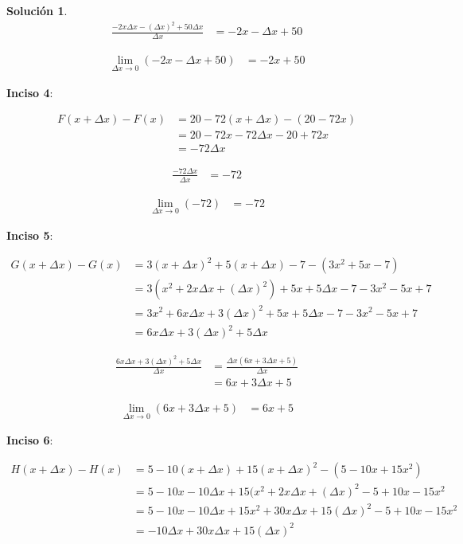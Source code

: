 \documentclass{article}
\theoremstyle{definition}
\newtheorem*{solution}{Solución}
\begin{document}
\begin{solution}
    \begin{align*}
        \frac{-2x\Delta x-(\Delta x)^2+50\Delta x}{\Delta x} &= -2x-\Delta x+50
    \end{align*}

    \begin{align*}
        \lim_{\Delta x \to 0} (-2x-\Delta x+50) &= -2x+50
    \end{align*}

\textbf{Inciso 4}:

    \begin{align*}
        F(x+\Delta x) - F(x) &= 20-72(x+\Delta x)-(20-72x) \\
        &= 20-72x-72\Delta x-20+72x \\
        &= -72\Delta x
    \end{align*}

    \begin{align*}
        \frac{-72\Delta x}{\Delta x} &= -72
    \end{align*}

    \begin{align*}
        \lim_{\Delta x \to 0} (-72) &= -72
    \end{align*}

\textbf{Inciso 5}:

    \begin{align*}
        G(x+\Delta x) - G(x) &= 3(x+\Delta x)^2+5(x+\Delta x)-7-(3x^2+5x-7) \\
        &= 3(x^2+2x\Delta x+(\Delta x)^2)+5x+5\Delta x-7-3x^2-5x+7 \\
        &= 3x^2+6x\Delta x+3(\Delta x)^2+5x+5\Delta x-7-3x^2-5x+7 \\
        &= 6x\Delta x+3(\Delta x)^2+5\Delta x
    \end{align*}

    \begin{align*}
        \frac{6x\Delta x+3(\Delta x)^2+5\Delta x}{\Delta x} &= \frac{\Delta x(6x+3\Delta x+5)}{\Delta x} \\
        &= 6x+3\Delta x+5
    \end{align*}

    \begin{align*}
        \lim_{\Delta x \to 0} (6x+3\Delta x+5) &= 6x+5
    \end{align*}

\textbf{Inciso 6}:

    \begin{align*}
        H(x+\Delta x) - H(x) &= 5-10(x+\Delta x)+15(x+\Delta x)^2-(5-10x+15x^2) \\
        &= 5-10x-10\Delta x+15(x^2+2x\Delta x+(\Delta x)^2-5+10x-15x^2 \\
        &= 5-10x-10\Delta x+15x^2+30x\Delta x+15(\Delta x)^2-5+10x-15x^2 \\
        &= -10\Delta x+30x\Delta x+15(\Delta x)^2
    \end{align*}


\end{solution}
\end{document}
